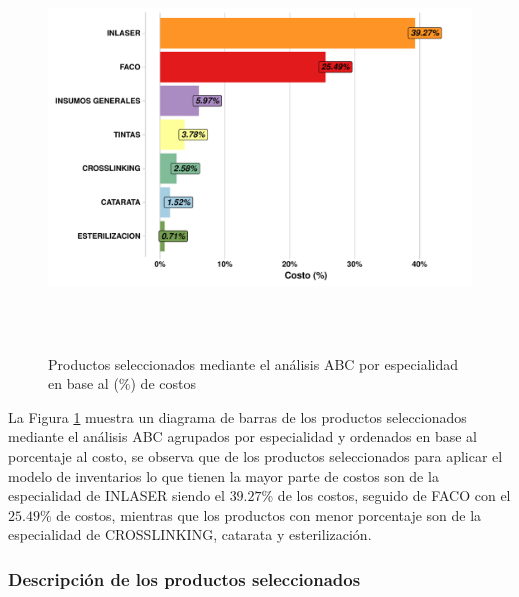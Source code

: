 \begin{figure}[h!]
  \caption{Productos seleccionados mediante el análisis ABC por especialidad en base al ($\%$) de costos}
  {\includegraphics[width=15cm, height=10cm]{images/Especialidad.pdf}}
  \label{fig:EspecialidadGrupoA_almacen}
\end{figure}

La Figura \ref{fig:EspecialidadGrupoA_almacen} muestra un diagrama de barras de los productos seleccionados mediante el análisis ABC agrupados por especialidad y ordenados en base al porcentaje al costo, se observa que de los productos seleccionados para aplicar el modelo de inventarios lo que tienen la mayor parte de costos son de la especialidad de INLASER siendo el $39.27\%$ de los costos, seguido de FACO con el $25.49\%$ de costos, mientras que los productos con menor porcentaje son de la especialidad de CROSSLINKING, catarata y esterilización.

\newpage
\subsubsection{Descripción de los productos seleccionados}


